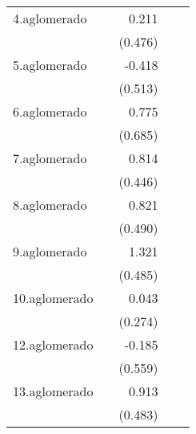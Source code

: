 {\begin{longtable}{l*{4}{D{.}{.}{-1}}}
\addlinespace
4.aglomerado&                     &       0.211         &                     &                     \\
            &                     &     (0.476)         &                     &                     \\
\addlinespace
5.aglomerado&                     &      -0.418         &                     &                     \\
            &                     &     (0.513)         &                     &                     \\
\addlinespace
6.aglomerado&                     &       0.775         &                     &                     \\
            &                     &     (0.685)         &                     &                     \\
\addlinespace
7.aglomerado&                     &       0.814         &                     &                     \\
            &                     &     (0.446)         &                     &                     \\
\addlinespace
8.aglomerado&                     &       0.821         &                     &                     \\
            &                     &     (0.490)         &                     &                     \\
\addlinespace
9.aglomerado&                     &       1.321\sym{**} &                     &                     \\
            &                     &     (0.485)         &                     &                     \\
\addlinespace
10.aglomerado&                     &       0.043         &                     &                     \\
            &                     &     (0.274)         &                     &                     \\
\addlinespace
12.aglomerado&                     &      -0.185         &                     &                     \\
            &                     &     (0.559)         &                     &                     \\
\addlinespace
13.aglomerado&                     &       0.913         &                     &                     \\
            &                     &     (0.483)         &                     &                     \\

\end{longtable}}

